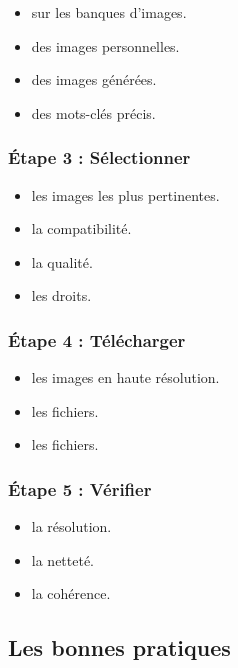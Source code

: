 \begin{itemize}
    \item {} sur les banques d'images.
    \item {} des images personnelles.
    \item {} des images générées.
    \item {} des mots-clés précis.
\end{itemize}

\subsubsection{Étape 3 : Sélectionner}

\begin{itemize}
    \item {} les images les plus pertinentes.
    \item {} la compatibilité.
    \item {} la qualité.
    \item {} les droits.
\end{itemize}

\subsubsection{Étape 4 : Télécharger}

\begin{itemize}
    \item {} les images en haute résolution.
    \item {} les fichiers.
    \item {} les fichiers.
\end{itemize}

\subsubsection{Étape 5 : Vérifier}

\begin{itemize}
    \item {} la résolution.
    \item {} la netteté.
    \item {} la cohérence.
\end{itemize}

\subsection{Les bonnes pratiques}

